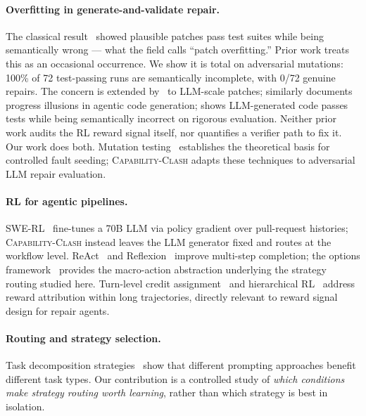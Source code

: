 \documentclass[sigconf,review,anonymous]{acmart}
\newcommand{\ccbench}{\textsc{Capability-Clash}}
\begin{document}
\paragraph{Overfitting in generate-and-validate repair.}
The classical result~\cite{qi2015overfitting} showed plausible patches pass test suites while being semantically wrong — what the field calls ``patch overfitting.'' Prior work treats this as an occasional occurrence. We show it is total on adversarial mutations: 100\% of 72 test-passing runs are semantically incomplete, with 0/72 genuine repairs. The concern is extended by~\cite{yang2025aprsur} to LLM-scale patches; \cite{shojaee2025illusion} similarly documents progress illusions in agentic code generation; \cite{liu2023your} shows LLM-generated code passes tests while being semantically incorrect on rigorous evaluation. Neither prior work audits the RL reward signal itself, nor quantifies a verifier path to fix it. Our work does both. Mutation testing~\cite{papadakis2019mutation} establishes the theoretical basis for controlled fault seeding; \ccbench{} adapts these techniques to adversarial LLM repair evaluation.

\paragraph{RL for agentic pipelines.}
SWE-RL~\cite{wei2025swerl} fine-tunes a 70B LLM via policy gradient over pull-request histories; \ccbench{} instead leaves the LLM generator fixed and routes at the workflow level. ReAct~\cite{yao2023react} and Reflexion~\cite{shinn2023reflexion} improve multi-step completion; the options framework~\cite{sutton1999options} provides the macro-action abstraction underlying the strategy routing studied here. Turn-level credit assignment~\cite{zeng2025turncredit} and hierarchical RL~\cite{zhou2024archer} address reward attribution within long trajectories, directly relevant to reward signal design for repair agents.

\paragraph{Routing and strategy selection.}
Task decomposition strategies~\cite{gabriel2024decomposing,wu2022aichains,wang2022selfconsistency} show that different prompting approaches benefit different task types. Our contribution is a controlled study of \emph{which conditions make strategy routing worth learning}, rather than which strategy is best in isolation.
\end{document}
